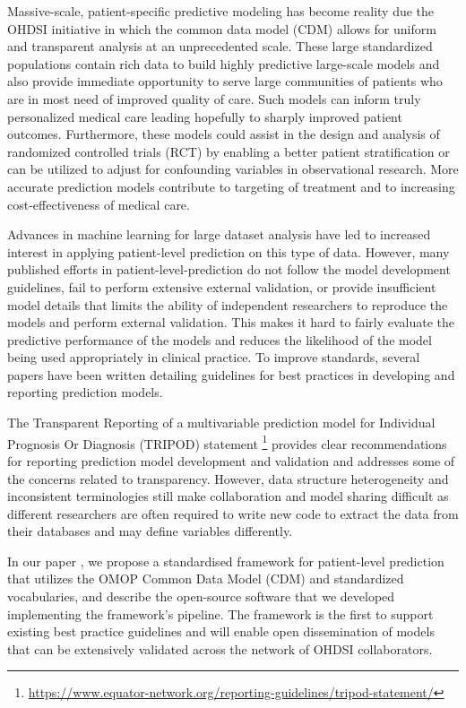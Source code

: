 \documentclass[11pt]{book}
\let\rmarkdownfootnote\footnote%
\def\footnote{\protect\rmarkdownfootnote}
\begin{document}
Massive-scale, patient-specific predictive modeling has become reality
due the OHDSI initiative in which the common data model (CDM) allows for
uniform and transparent analysis at an unprecedented scale. These large
standardized populations contain rich data to build highly predictive
large-scale models and also provide immediate opportunity to serve large
communities of patients who are in most need of improved quality of
care. Such models can inform truly personalized medical care leading
hopefully to sharply improved patient outcomes. Furthermore, these
models could assist in the design and analysis of randomized controlled
trials (RCT) by enabling a better patient stratification or can be
utilized to adjust for confounding variables in observational research.
More accurate prediction models contribute to targeting of treatment and
to increasing cost-effectiveness of medical care.

Advances in machine learning for large dataset analysis have led to
increased interest in applying patient-level prediction on this type of
data. However, many published efforts in patient-level-prediction do not
follow the model development guidelines, fail to perform extensive
external validation, or provide insufficient model details that limits
the ability of independent researchers to reproduce the models and
perform external validation. This makes it hard to fairly evaluate the
predictive performance of the models and reduces the likelihood of the
model being used appropriately in clinical practice. To improve
standards, several papers have been written detailing guidelines for
best practices in developing and reporting prediction models.

The Transparent Reporting of a multivariable prediction model for
Individual Prognosis Or Diagnosis (TRIPOD) statement \footnote{\url{https://www.equator-network.org/reporting-guidelines/tripod-statement/}}
provides clear recommendations for reporting prediction model
development and validation and addresses some of the concerns related to
transparency. However, data structure heterogeneity and inconsistent
terminologies still make collaboration and model sharing difficult as
different researchers are often required to write new code to extract
the data from their databases and may define variables differently.

In our paper \citep{reps2018}, we propose a standardised framework for
patient-level prediction that utilizes the OMOP Common Data Model (CDM)
and standardized vocabularies, and describe the open-source software
that we developed implementing the framework's pipeline. The framework
is the first to support existing best practice guidelines and will
enable open dissemination of models that can be extensively validated
across the network of OHDSI collaborators.
\end{document}

